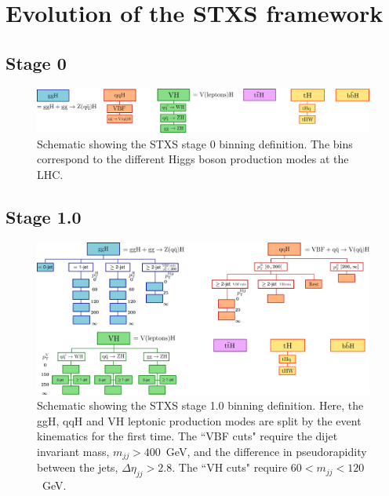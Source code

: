 \chapter{Evolution of the STXS framework}\label{app:merging_schemes}
\vspace{-.5cm}
\section{Stage 0}
\begin{figure}[htb!]
  \centering
  \includegraphics[width=.9\linewidth]{Figures/app_merging_schemes/stage0.pdf}
  \caption[Schematic of the STXS stage 0 binning scheme]
  {
    Schematic showing the STXS stage 0 binning definition. The bins correspond to the different Higgs boson production modes at the LHC.
  }
  \label{fig:stxs_schematic_stage0}
\end{figure}
\vspace{-.5cm}
\FloatBarrier
\section{Stage 1.0}
\begin{figure}[htb!]
  \centering
  \includegraphics[width=.9\linewidth]{Figures/app_merging_schemes/stage1p0.pdf}
  \caption[Schematic of the STXS stage 1.0 binning scheme]
  {
    Schematic showing the STXS stage 1.0 binning definition. Here, the ggH, qqH and VH leptonic production modes are split by the event kinematics for the first time. The ``VBF cuts" require the dijet invariant mass, $m_{jj}>400$~GeV, and the difference in pseudorapidity between the jets, $\Delta\eta_{jj}>2.8$. The ``VH cuts" require $60<m_{jj}<120$~GeV.
  }
  \label{fig:stxs_schematic_stage1p0}
\end{figure}
\FloatBarrier
